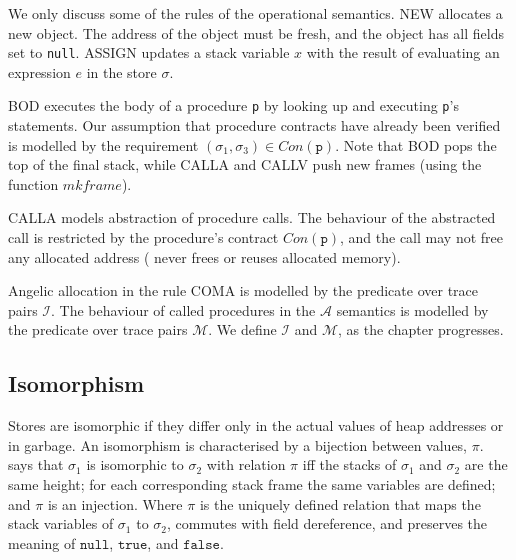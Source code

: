 \documentclass[runningheads,a4paper]{llncs}
\newcommand*{\nullv}{\texttt{null}}
\newcommand*{\truev}{\texttt{true}}
\newcommand*{\falsev}{\texttt{false}}
\newcommand*{\Contract}{\mathit{Con}}
\newcommand*\Asemantics{\mathcal{A}}
\newcommand*\asemantics{$\Asemantics$ semantics}
\newcommand*{\callRuleAbstract}{\textnormal{CALLA}}
\newcommand*{\composeRuleAbstract}{\textnormal{COMA}}
\newcommand*{\callRuleConcrete}{\textnormal{CALLV}}
\newcommand*{\callRuleVerified}{\callRuleConcrete{}}
\newcommand*{\bodyRule}{\textnormal{BOD}}
\newcommand*{\blAssign}{ASSIGN}
\newcommand*{\blNew}{NEW}
\newcommand*{\fun}{\texttt{p}}
\newcommand*{\mkframe}{\mathit{mkframe}}
\newcommand*{\isoR}{\mathcal{I}}
\newcommand*{\mutR}{\mathcal{M}}
\newcommand*{\store}{\sigma}
\begin{document}
We only discuss some of the rules of the operational semantics. \blNew{} allocates a new object. The address of the object must be fresh, and the object has all fields set to \texttt{null}. \blAssign{} updates a stack variable $x$ with the result of evaluating an expression $e$ in the store $\store$.

\bodyRule{} executes the body of a procedure \texttt{\fun} by looking up and executing \texttt{\fun}'s statements. Our assumption that procedure contracts have already been verified is modelled by the requirement $(\store_1,\store_3) \in \Contract(\fun)$. Note that \bodyRule{} pops the top of the final stack, while \callRuleAbstract{} and \callRuleVerified{} push new frames (using the function $\mkframe$). 

\callRuleAbstract{} models abstraction of procedure calls. The behaviour of the abstracted call is restricted by the procedure's contract $\Contract(\fun)$, and the call may not free any allocated address (\lang{} never frees or reuses allocated memory).

Angelic allocation in the rule \composeRuleAbstract{} is modelled by the predicate over trace pairs $\isoR$. The behaviour of called procedures in the \asemantics{} is modelled by the predicate over trace pairs $\mutR$. We define $\isoR$ and $\mutR$, as the chapter progresses. 

\subsection{Isomorphism} 

Stores are isomorphic if they differ only in the actual values of heap addresses or in garbage. An isomorphism is characterised by a bijection between values, $\pi$.  says that $\store_1$ is isomorphic to $\store_2$ with relation $\pi$ iff the stacks of $\store_1$ and $\store_2$ are the same height; for each corresponding stack frame the same variables are defined; and $\pi$ is an injection. Where $\pi$ is the uniquely defined relation that maps the stack variables of $\store_1$ to $\store_2$, commutes with field dereference, and preserves the meaning of $\nullv$, $\truev$, and $\falsev$. 
\end{document}
